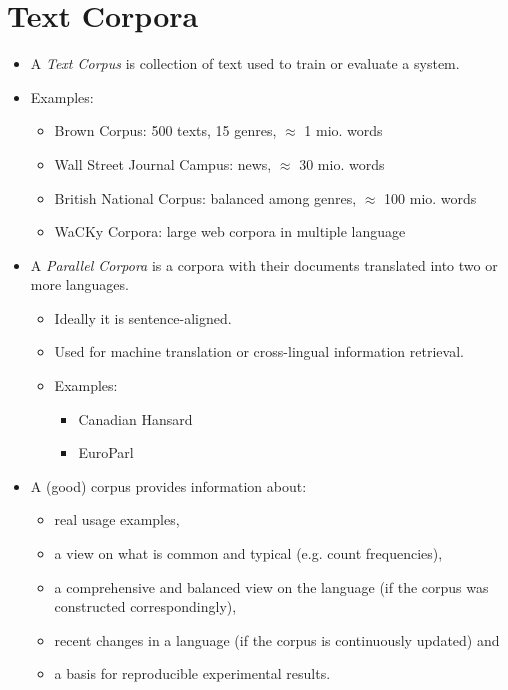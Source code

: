 \documentclass[a4paper, 11pt, accentcolor = tud3b]{tudreport}
\begin{document}
        \section{Text Corpora} %
            \begin{itemize}
            	\item A \textit{Text Corpus} is collection of text used to train or evaluate a system.
            	\item Examples:
            		\begin{itemize}
            			\item Brown Corpus: 500 texts, 15 genres, \(\approx\) 1 mio. words
            			\item Wall Street Journal Campus: news, \(\approx\) 30 mio. words
            			\item British National Corpus: balanced among genres, \(\approx\) 100 mio. words
            			\item WaCKy Corpora: large web corpora in multiple language
            		\end{itemize}
            	\item A \textit{Parallel Corpora} is a corpora with their documents translated into two or more languages.
            		\begin{itemize}
            			\item Ideally it is sentence-aligned.
            			\item Used for machine translation or cross-lingual information retrieval.
            			\item Examples:
            				\begin{itemize}
            					\item Canadian Hansard
            					\item EuroParl
            				\end{itemize}
            		\end{itemize}
            	\item A (good) corpus provides information about:
            		\begin{itemize}
            			\item real usage examples,
            			\item a view on what is common and typical (e.g. count frequencies),
            			\item a comprehensive and balanced view on the language (if the corpus was constructed correspondingly),
            			\item recent changes in a language (if the corpus is continuously updated) and
            			\item a basis for reproducible experimental results.
            		\end{itemize}
            \end{itemize}
\end{document}
